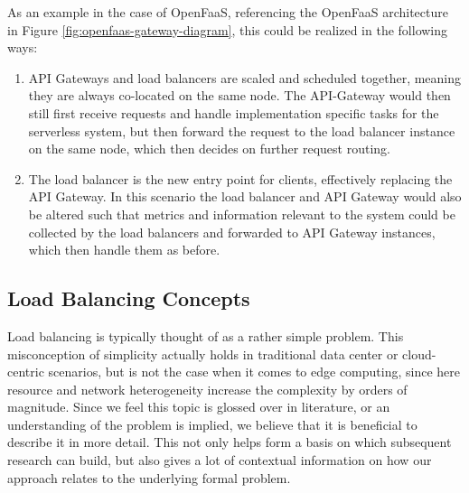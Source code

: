 As an example in the case of OpenFaaS, referencing the OpenFaaS architecture in Figure \ref{fig:openfaas-gateway-diagram}, this could be realized in the following ways:
\begin{enumerate}
    \item API Gateways and load balancers are scaled and scheduled together, meaning they are always co-located on the same node. The API-Gateway would then still first receive requests and handle implementation specific tasks for the serverless system, but then forward the request to the load balancer instance on the same node, which then decides on further request routing.
    \item The load balancer is the new entry point for clients, effectively replacing the API Gateway. In this scenario the load balancer and API Gateway would also be altered such that metrics and information relevant to the system could be collected by the load balancers and forwarded to API Gateway instances, which then handle them as before.
\end{enumerate}

\subsection{Load Balancing Concepts}
Load balancing is typically thought of as a rather simple problem. This misconception of simplicity actually holds in traditional data center or cloud-centric scenarios, but is not the case when it comes to edge computing, since here resource and network heterogeneity increase the complexity by orders of magnitude.
Since we feel this topic is glossed over in literature, or an understanding of the problem is implied, we believe that it is beneficial to describe it in more detail. This not only helps form a basis on which subsequent research can build, but also gives a lot of contextual information on how our approach relates to the underlying formal problem.

